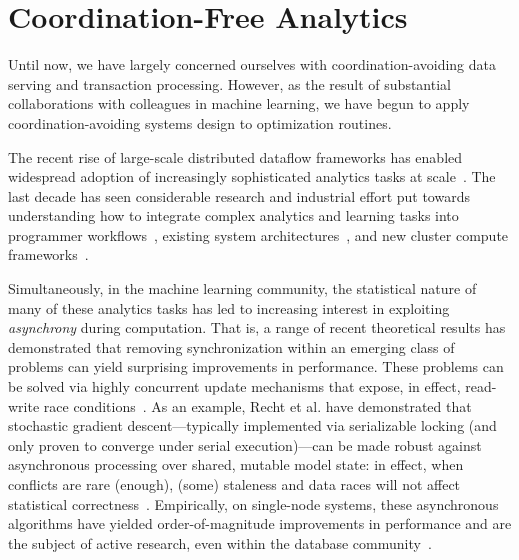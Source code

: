 \section{Coordination-Free Analytics}
\label{sec:cf-analytics}

Until now, we have largely concerned ourselves with coordination-avoiding
data serving and transaction processing. However, as the result of
substantial collaborations with colleagues in machine learning, we
have begun to apply coordination-avoiding systems design to
optimization routines.

 The recent rise
of large-scale distributed dataflow frameworks has enabled widespread
adoption of increasingly sophisticated analytics tasks at
scale~\cite{carey-bigdata,spark,stratosphere,mapreduce,dryad}. The
last decade has seen considerable research and industrial effort put
towards understanding how to integrate complex analytics and learning
tasks into programmer workflows~\cite{chris-feature,mlbase}, existing
system architectures~\cite{bismarck,madlib}, and new cluster compute
frameworks~\cite{mli,vowpal}.


Simultaneously, in the machine learning community, the statistical
nature of many of these analytics tasks has led to increasing interest
in exploiting \textit{asynchrony} during computation. That is, a range
of recent theoretical results has demonstrated that removing
synchronization within an emerging class of problems can yield surprising
improvements in performance. These problems can be
solved via highly concurrent update mechanisms that expose, in effect,
read-write race
conditions~\cite{dual-averaging,hogwild-coorddescent,shalev-accelerated}. As
an example, Recht et al. have demonstrated that stochastic gradient
descent---typically implemented via serializable locking (and only
proven to converge under serial execution)---can be made robust
against asynchronous processing over shared, mutable model state: in
effect, when conflicts are rare (enough), (some) staleness and data
races will not affect statistical
correctness~\cite{hogwild}. Empirically, on single-node systems, these
asynchronous algorithms have yielded order-of-magnitude improvements
in performance and are the subject of active research, even within the
database community~\cite{bismarck,dimmwitted,sgd-matrix}.

